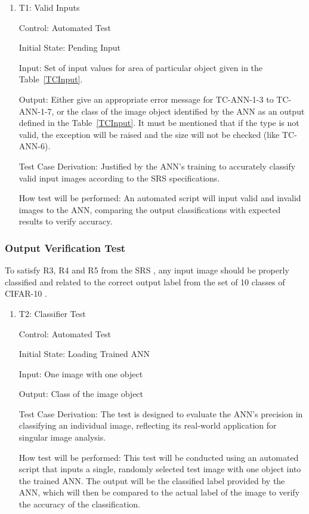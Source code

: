 \documentclass[12pt, titlepage]{article}
\begin{document}
\begin{enumerate}

  \item{T1: Valid Inputs\\} 

  Control: Automated Test
  
  Initial State: Pending Input
  
  Input: Set of input values for area of particular object given in the Table~\ref{TCInput}.
  
  Output: Either give an appropriate error message for TC-ANN-1-3 to TC-ANN-1-7,
  or the class of the image object identified by the ANN as an output defined in the Table~\ref{TCInput}. 
  It must be mentioned that if the type is not valid, the exception will be raised and the size will not 
  be checked (like TC-ANN-6).

  Test Case Derivation: Justified by the ANN's training to accurately classify 
  valid input images according to the 
  SRS \cite{SRS} specifications.

  How test will be performed: An automated script will input valid and invalid images to the ANN, 
  comparing the output classifications with expected results to verify accuracy.

\end{enumerate}

\subsubsection{Output Verification Test} \label{OutputVerificationTest}
To satisfy R3, R4 and R5 from the 
SRS \cite{SRS}, any input image 
should be properly classified and related to the correct output label
from the set of 10 classes of CIFAR-10 \cite{CIFAR10}.

\begin{enumerate}

  \item{T2: Classifier Test\\} \label{T2}

  Control: Automated Test
  
  Initial State: Loading Trained ANN
  
  Input: One image with one object
  
  Output: Class of the image object
  
  Test Case Derivation: The test is designed to evaluate the ANN's precision in classifying an 
  individual image, reflecting its real-world application for singular image analysis.

  How test will be performed: This test will be conducted using an automated script that 
  inputs a single, randomly selected test image with one object into the trained ANN. 
  The output will be the classified label provided by 
   the ANN, which will then be compared to the actual label of the image to verify the accuracy of the classification.

\end{enumerate}
\end{document}

